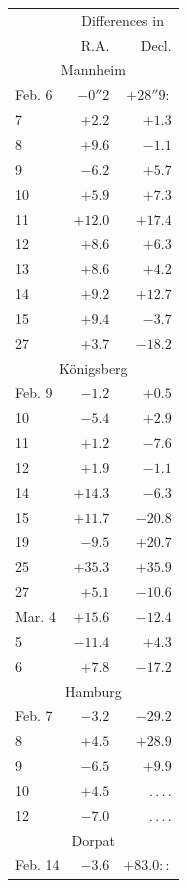 \begin{center}
\begin{tabular}{l|r|r}
& \multicolumn{2}{c}{Differences in} \\
& R.A. & Decl. \\
\multicolumn{3}{c}{Mannheim} \\
Feb. 6 & $-0''2$ & $+28''9\!:$ \\
7 & $+2.2$ & $+1.3$ \\
8 & $+9.6$ & $-1.1$ \\
9 & $-6.2$ & $+5.7$ \\
10 & $+5.9$ & $+7.3$ \\
11 & $+12.0$ & $+17.4$ \\
12 & $+8.6$ & $+6.3$ \\
13 & $+8.6$ & $+4.2$ \\
14 & $+9.2$ & $+12.7$ \\
15 & $+9.4$ & $-3.7$ \\
27 & $+3.7$ & $-18.2$ \\
\multicolumn{3}{c}{Königsberg} \\
Feb. 9 & $-1.2$ & $+0.5$ \\
10 & $-5.4$ & $+2.9$ \\
11 & $+1.2$ & $-7.6$ \\
12 & $+1.9$ & $-1.1$ \\
14 & $+14.3$ & $-6.3$ \\
15 & $+11.7$ & $-20.8$ \\
19 & $-9.5$ & $+20.7$ \\
25 & $+35.3$ & $+35.9$ \\
27 & $+5.1$ & $-10.6$ \\
Mar. 4 & $+15.6$ & $-12.4$ \\
5 & $-11.4$ & $+4.3$ \\
6 & $+7.8$ & $-17.2$ \\
\multicolumn{3}{c}{Hamburg} \\
Feb. 7 & $-3.2$ & $-29.2$ \\
8 & $+4.5$ & $+28.9$ \\
9 & $-6.5$ & $+9.9$ \\
10 & $+4.5$ & \mbox{.\,.\,.\,.} \\
12 & $-7.0$ & \mbox{.\,.\,.\,.} \\
\multicolumn{3}{c}{Dorpat} \\
Feb. 14 & $-3.6$ & $+83.0\!::$ \\
\end{tabular}
\end{center}

